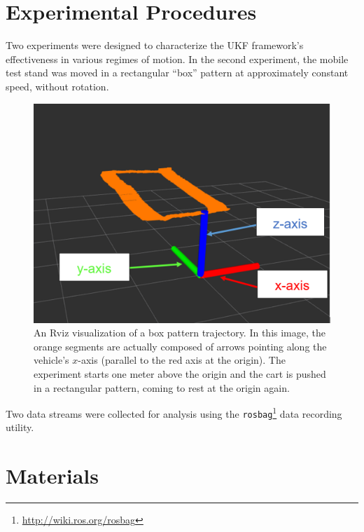 \section{Experimental Procedures}

Two experiments were designed to characterize the UKF framework's effectiveness in various regimes of motion. In the second experiment, the mobile test stand was moved in a rectangular ``box'' pattern at approximately constant speed, without rotation.

\begin{figure}[h]
  \centering
    \includegraphics[width=\textwidth]{good_box_5_cropped}
  \caption[Rviz Visualization of a Box Pattern Trajectory]{An Rviz visualization of a box pattern trajectory. In this image, the orange segments are actually composed of arrows pointing along the vehicle's $x$-axis (parallel to the red axis at the origin). The experiment starts one meter above the origin and the cart is pushed in a rectangular pattern, coming to rest at the origin again.}
  \label{fig:good_box}
\end{figure}


Two data streams were collected for analysis using the \texttt{rosbag}\footnote{\url{http://wiki.ros.org/rosbag}} data recording utility.

\clearpage
\section{Materials}
